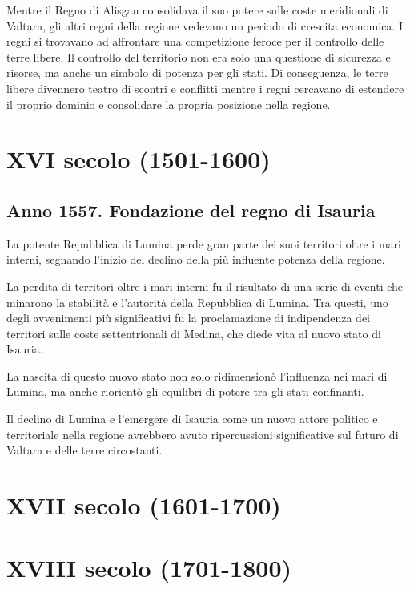 Mentre il Regno di Alisgan consolidava il suo potere sulle coste
meridionali di Valtara, gli altri regni della regione vedevano un
periodo di crescita economica. I regni si trovavano ad affrontare una
competizione feroce per il controllo delle terre libere. Il controllo
del territorio non era solo una questione di sicurezza e risorse, ma
anche un simbolo di potenza per gli stati. Di conseguenza, le terre
libere divennero teatro di scontri e conflitti mentre i regni cercavano
di estendere il proprio dominio e consolidare la propria posizione nella
regione.

\section{XVI secolo (1501-1600)}\label{xvi-secolo-1501-1600}

\subsection{Anno 1557. Fondazione del regno di
Isauria}\label{anno-1557.-fondazione-del-regno-di-isauria}

La potente Repubblica di Lumina perde gran parte dei suoi territori
oltre i mari interni, segnando l'inizio del declino della più influente
potenza della regione.

La perdita di territori oltre i mari interni fu il risultato di una
serie di eventi che minarono la stabilità e l'autorità della Repubblica
di Lumina. Tra questi, uno degli avvenimenti più significativi fu la
proclamazione di indipendenza dei territori sulle coste settentrionali
di Medina, che diede vita al nuovo stato di Isauria.

La nascita di questo nuovo stato non solo ridimensionò l'influenza nei
mari di Lumina, ma anche riorientò gli equilibri di potere tra gli stati
confinanti.

Il declino di Lumina e l'emergere di Isauria come un nuovo attore
politico e territoriale nella regione avrebbero avuto ripercussioni
significative sul futuro di Valtara e delle terre circostanti.

\section{XVII secolo (1601-1700)}\label{xvii-secolo-1601-1700}

\section{XVIII secolo (1701-1800)}\label{xviii-secolo-1701-1800}

